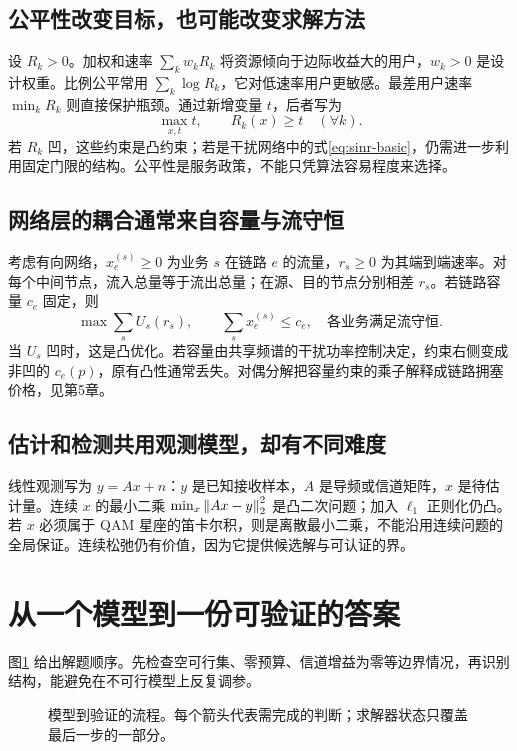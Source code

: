 \subsection{公平性改变目标，也可能改变求解方法}
设 $R_k>0$。加权和速率 $\sum_k w_kR_k$ 将资源倾向于边际收益大的用户，$w_k>0$ 是设计权重。比例公平常用 $\sum_k\log R_k$，它对低速率用户更敏感。最差用户速率 $\min_k R_k$ 则直接保护瓶颈。通过新增变量 $t$，后者写为
\begin{equation}
 \max_{x,t}t,\qquad R_k(x)\ge t\quad(\forall k).
\end{equation}
若 $R_k$ 凹，这些约束是凸约束；若是干扰网络中的式\eqref{eq:sinr-basic}，仍需进一步利用固定门限的结构。公平性是服务政策，不能只凭算法容易程度来选择。

\subsection{网络层的耦合通常来自容量与流守恒}
考虑有向网络，$x_e^{(s)}\ge0$ 为业务 $s$ 在链路 $e$ 的流量，$r_s\ge0$ 为其端到端速率。对每个中间节点，流入总量等于流出总量；在源、目的节点分别相差 $r_s$。若链路容量 $c_e$ 固定，则
\begin{equation}
 \max \sum_s U_s(r_s),\qquad
 \sum_s x_e^{(s)}\le c_e,\quad\text{各业务满足流守恒}.
\end{equation}
当 $U_s$ 凹时，这是凸优化。若容量由共享频谱的干扰功率控制决定，约束右侧变成非凹的 $c_e(p)$，原有凸性通常丢失。对偶分解把容量约束的乘子解释成链路拥塞价格，见第5章。

\subsection{估计和检测共用观测模型，却有不同难度}
线性观测写为 $y=Ax+n$：$y$ 是已知接收样本，$A$ 是导频或信道矩阵，$x$ 是待估计量。连续 $x$ 的最小二乘 $\min_x\left\lVert Ax-y\right\rVert_2^2$ 是凸二次问题；加入 $\ell_1$ 正则化仍凸。若 $x$ 必须属于 QAM 星座的笛卡尔积，则是离散最小二乘，不能沿用连续问题的全局保证。连续松弛仍有价值，因为它提供候选解与可认证的界。

\section{从一个模型到一份可验证的答案}
图\ref{fig:workflow} 给出解题顺序。先检查空可行集、零预算、信道增益为零等边界情况，再识别结构，能避免在不可行模型上反复调参。
\begin{figure}[htbp]\centering
{}
\caption{模型到验证的流程。每个箭头代表需完成的判断；求解器状态只覆盖最后一步的一部分。}\label{fig:workflow}
\end{figure}

